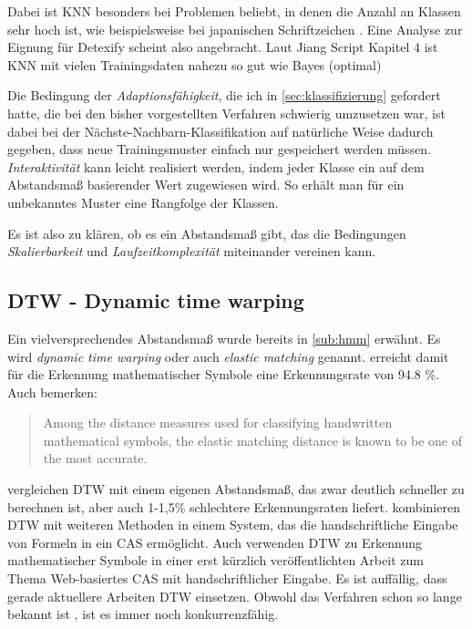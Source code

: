 Dabei ist KNN besonders bei Problemen beliebt, in denen die Anzahl an Klassen sehr hoch ist, wie beispielsweise bei japanischen Schriftzeichen \cite{Jaeger:2003p1097}. Eine Analyse zur Eignung für Detexify scheint also angebracht.
\TODO Laut Jiang Script Kapitel 4 ist KNN mit vielen Trainingsdaten nahezu so gut wie Bayes (optimal)

Die Bedingung der \emph{Adaptionsfähigkeit}, die ich in \ref{sec:klassifizierung} gefordert hatte, die bei den bisher vorgestellten Verfahren schwierig umzusetzen war, ist dabei bei der Nächste-Nachbarn-Klassifikation auf natürliche Weise dadurch gegeben, dass neue Trainingsmuster einfach nur gespeichert werden müssen. \emph{Interaktivität} kann leicht realisiert werden, indem jeder Klasse ein auf dem Abstandsmaß basierender Wert zugewiesen wird. So erhält man für ein unbekanntes Muster eine Rangfolge der Klassen.

Es ist also zu klären, ob es ein Abstandsmaß gibt, das die Bedingungen \emph{Skalierbarkeit} und \emph{Laufzeitkomplexität} miteinander vereinen kann.

\subsection[DTW]{DTW - Dynamic time warping} \label{sub:dtw}

Ein vielversprechendes Abstandsmaß wurde bereits in \ref{sub:hmm} erwähnt. Es wird \emph{dynamic time warping} oder auch \emph{elastic matching} genannt. \citet{Xie:2007p11427} erreicht damit für die Erkennung mathematischer Symbole  eine Erkennungsrate von 94.8 \%. Auch \citet{Golubitsky:2009p2433} bemerken:
\begin{quote}
  Among the distance measures used for classifying handwritten mathematical symbols, the elastic matching distance is known to be one of the most accurate.
\end{quote}

\citet{Golubitsky:2009p1842} vergleichen DTW mit einem eigenen Abstandsmaß, das zwar deutlich schneller zu berechnen ist, aber auch 1-1,5\% schlechtere Erkennungsraten liefert. \citet{Labahn:2008p10301} kombinieren DTW mit weiteren Methoden in einem System, das die handschriftliche Eingabe von Formeln in ein \ac{CAS} ermöglicht.
Auch \citet{Vuong:2010p10279} verwenden DTW %
zu Erkennung mathematischer Symbole in einer erst kürzlich veröffentlichten Arbeit zum Thema Web-basiertes CAS mit handschriftlicher Eingabe. Es ist auffällig, dass gerade aktuellere Arbeiten DTW einsetzen. Obwohl das Verfahren schon so lange bekannt ist \cite{Tappert:1982p10305}, ist es immer noch konkurrenzfähig.

